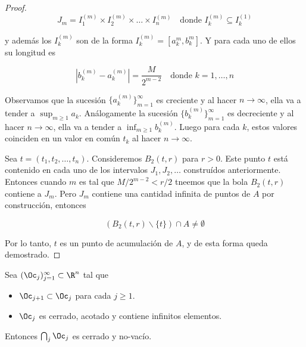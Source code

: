 \begin{proof}
    \[
    J_m = I_1^{(m)} \times I_2^{(m)} \times \dots \times I_n^{(m)} \quad \text{donde $I_k^{(m)} \subseteq I_k^{(1)}$}
    \]
    
    \noindent y además los $I_k^{(m)}$ son de la forma $I_k^{(m)} = [a_k^m, b_k^m]$. Y para cada uno de ellos su longitud es
    
    \[
    \left|b_k^{(m)} - a_k^{(m)}\right| = \frac{M}{2^{m-2}} \quad \text{donde $k = 1, \dots, n$}
    \]
    
    Observamos que la sucesión $\{a_k^{(m)}\}_{m=1}^{\infty}$ es creciente y al hacer $n \rightarrow \infty$, ella va a tender a $\sup_{m \geq 1} a_k$. Análogamente la sucesión $\{b_k^{(m)}\}_{m=1}^{\infty}$ es decreciente y al hacer $n \rightarrow \infty$, ella va a tender a $\inf_{m \geq 1} b_k^{(m)}$. Luego para cada $k$, estos valores coinciden en un valor en común $t_k$ al hacer $n \rightarrow \infty$.
    
    Sea $t = (t_1, t_2, \dots, t_n)$. Consideremos $B_2(t, r)$ para $r > 0$. Este punto $t$ está contenido en cada uno de los intervalos $J_1, J_2, \dots$ construídos anteriormente. Entonces cuando $m$ es tal que $M/2^{m-2} < r/2$ tneemos que la bola $B_2(t, r)$ contiene a $J_m$. Pero $J_m$ contiene una cantidad infinita de puntos de $A$ por construcción, entonces
    
    \[
    \left( B_2(t, r) \backslash \{t\} \right) \cap A \neq \emptyset
    \]
    
    Por lo tanto, $t$ es un punto de acumulación de $A$, y de esta forma queda demostrado.
\end{proof}

\begin{teo}[Cantor]
    Sea $(\Oc_j)_{j=1}^{\infty} \subset \R^n$ tal que
    
    \begin{itemize}
        \item $\Oc_{j+1} \subset \Oc_j$ para cada $j \geq 1$.
        \item $\Oc_j$ es cerrado, acotado y contiene infinitos elementos.
    \end{itemize}
    
    Entonces $\bigcap_j \Oc_j$ es cerrado y no-vacío.
\end{teo}

